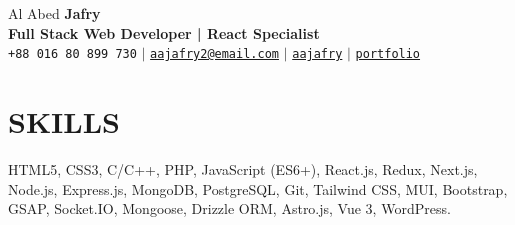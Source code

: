 \documentclass[letterpaper,11pt]{article}
\begin{document}
\begin{center}
  {\Huge Al Abed \textbf{\Huge Jafry}} \\ \vspace{5pt}
  \textbf{\Large\textcolor{dark-grey}{Full Stack Web Developer | React Specialist}} \\ \vspace{3pt}
  \small \faPhone* \texttt{+88 016 80 899 730} \hspace{1pt} $|$
  \hspace{1pt} \faEnvelope \hspace{2pt} \href{mailto:aajafry2@email.com}{\texttt{aajafry2@email.com}} \hspace{1pt} $|$ 
  \hspace{1pt} \faGithub \hspace{2pt} \href{https://github.com/aajafry}{\texttt{aajafry}} \hspace{1pt} $|$ 
  \hspace{1pt} \faGlobe \hspace{2pt} \href{https://aajafry.vercel.app}{\texttt{portfolio}} \hspace{1pt}
\end{center}

\section{SKILLS}
 \begin{itemize}[leftmargin=0in, label={}]
    \small{\item{
    {HTML5, CSS3, C/C++, PHP, JavaScript (ES6+), React.js, Redux, Next.js, Node.js, Express.js, MongoDB, PostgreSQL, Git, Tailwind CSS, MUI, Bootstrap, GSAP, Socket.IO, Mongoose, Drizzle ORM, Astro.js, Vue 3, WordPress.}
    }}
 \end{itemize}

\end{document}
